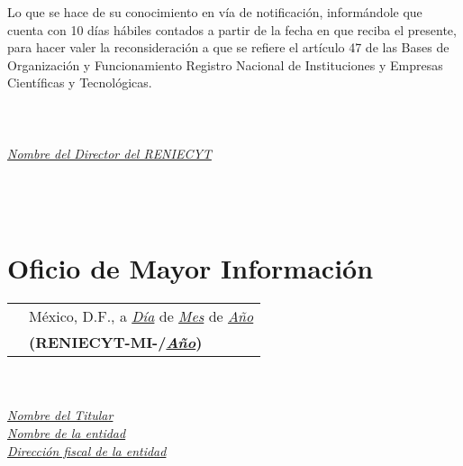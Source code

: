 \noindent Lo que se hace de su conocimiento en vía de notificación, informándole que cuenta con 10 días hábiles contados a partir de la fecha en que reciba el presente, para hacer valer la reconsideración a que se refiere el artículo 47 de las Bases de Organización y Funcionamiento Registro Nacional de Instituciones y Empresas Científicas y Tecnológicas.\\ \\
 

\\ \\

\noindent \underline{{\it Nombre del Director del RENIECYT}}\\
\\
\\
\\


\newpage
\section{Oficio de Mayor Información}
\label{appendix:Constancias:ConstanciaMayorInfo}

\begin{tabular}{ m{} m{} }%
& México, D.F., a \underline{{\it Día}} de \underline{{\it Mes}} de \underline{{\it Año}} \\
& {\bf (RENIECYT-MI-/\underline{{\it Año}})} \\
\end{tabular}\\ \\


\noindent \underline{{\it Nombre del Titular}}\\
\noindent \underline{{\it Nombre de la entidad}}\\
\noindent \underline{{\it Dirección fiscal de la entidad}}\\ \\


